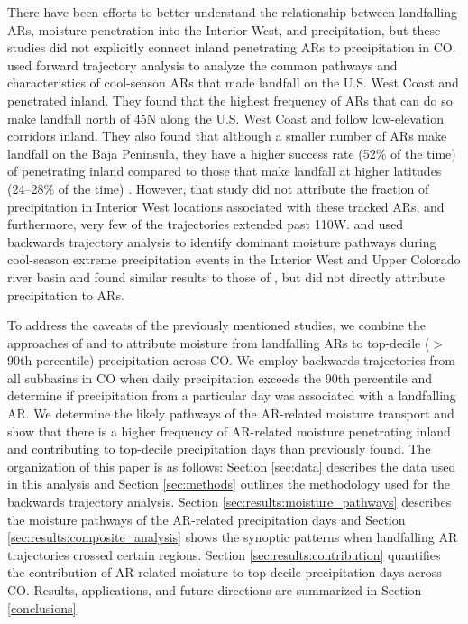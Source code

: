 \documentclass[draft]{agujournal2019}
\begin{document}
There have been efforts to better understand the relationship between landfalling ARs, moisture penetration into the Interior West, and precipitation, but these studies did not explicitly connect inland penetrating ARs to precipitation in CO.  used forward trajectory analysis to analyze the common pathways and characteristics of cool-season ARs that made landfall on the U.S. West Coast and penetrated inland. They found that the highest frequency of ARs that can do so make landfall north of 45\textdegree N along the U.S. West Coast and follow low-elevation corridors inland. They also found that although a smaller number of ARs make landfall on the Baja Peninsula, they have a higher success rate (52\% of the time) of penetrating inland compared to those that make landfall at higher latitudes (24--28\% of the time) \cite{Rutz2015}. However, that study did not attribute the fraction of precipitation in Interior West locations associated with these tracked ARs, and furthermore, very few of the trajectories extended past 110\textdegree W.  and  used backwards trajectory analysis to identify dominant moisture pathways during cool-season extreme precipitation events in the Interior West and Upper Colorado river basin and found similar results to those of , but did not directly attribute precipitation to ARs.

To address the caveats of the previously mentioned studies, we combine the approaches of  and  to attribute moisture from landfalling ARs to top-decile ($>$ 90th percentile) precipitation across CO. We employ backwards trajectories from all subbasins in CO when daily precipitation exceeds the 90th percentile and determine if precipitation from a particular day was associated with a landfalling AR. We determine the likely pathways of the AR-related moisture transport and show that there is a higher frequency of AR-related moisture penetrating inland and contributing to top-decile precipitation days than previously found. The organization of this paper is as follows: Section \ref{sec:data} describes the data used in this analysis and Section \ref{sec:methods} outlines the methodology used for the backwards trajectory analysis. Section \ref{sec:results:moisture_pathways} describes the moisture pathways of the AR-related precipitation days and Section \ref{sec:results:composite_analysis} shows the synoptic patterns when landfalling AR trajectories crossed certain regions. Section \ref{sec:results:contribution} quantifies the contribution of AR-related moisture to top-decile precipitation days across CO. Results, applications, and future directions are summarized in Section \ref{conclusions}. 
\end{document}
